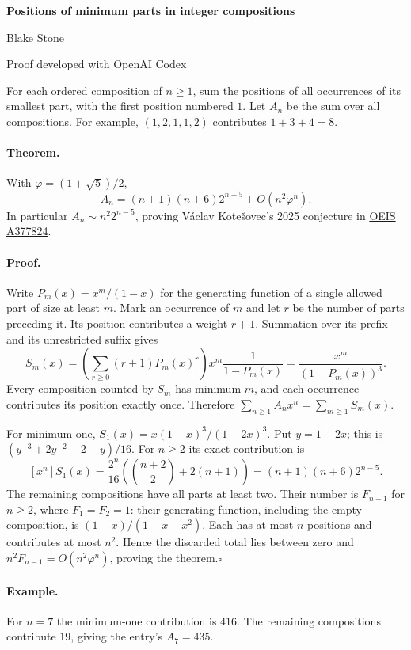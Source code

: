 \documentclass[11pt,letterpaper]{article}
\begin{document}
\begin{center}
{\LARGE\bfseries Positions of minimum parts in integer compositions}\par\vspace{8pt}
Blake Stone\par{\small Proof developed with OpenAI Codex}
\end{center}
For each ordered composition of $n\ge1$, sum the positions of all occurrences of its smallest part, with the first position numbered $1$. Let $A_n$ be the sum over all compositions. For example, $(1,2,1,1,2)$ contributes $1+3+4=8$.

\paragraph{Theorem.} With $\varphi=(1+\sqrt5)/2$,
\[
 A_n=(n+1)(n+6)2^{n-5}+O(n^2\varphi^n).
\]
In particular $A_n\sim n^2 2^{n-5}$, proving V\'aclav Kote\v{s}ovec's 2025 conjecture in \href{https://oeis.org/A377824}{OEIS A377824}.

\paragraph{Proof.} Write $P_m(x)=x^m/(1-x)$ for the generating function of a single allowed part of size at least $m$. Mark an occurrence of $m$ and let $r$ be the number of parts preceding it. Its position contributes a weight $r+1$. Summation over its prefix and its unrestricted suffix gives
\[
 S_m(x)=\left(\sum_{r\ge0}(r+1)P_m(x)^r\right)x^m\frac1{1-P_m(x)}
       =\frac{x^m}{(1-P_m(x))^3}.
\]
Every composition counted by $S_m$ has minimum $m$, and each occurrence contributes its position exactly once. Therefore $\sum_{n\ge1} A_n x^n=\sum_{m\ge1} S_m(x)$.

For minimum one, $S_1(x)=x(1-x)^3/(1-2x)^3$. Put $y=1-2x$; this is $(y^{-3}+2y^{-2}-2-y)/16$. For $n\ge2$ its exact contribution is
\[
 [x^n]S_1(x)=\frac{2^n}{16}\left(\binom{n+2}{2}+2(n+1)\right)
             =(n+1)(n+6)2^{n-5}.
\]
The remaining compositions have all parts at least two. Their number is $F_{n-1}$ for $n\ge2$, where $F_1=F_2=1$: their generating function, including the empty composition, is $(1-x)/(1-x-x^2)$. Each has at most $n$ positions and contributes at most $n^2$. Hence the discarded total lies between zero and $n^2F_{n-1}=O(n^2\varphi^n)$, proving the theorem.\hfill$\square$

\paragraph{Example.} For $n=7$ the minimum-one contribution is $416$. The remaining compositions contribute $19$, giving the entry's $A_7=435$.
\end{document}
